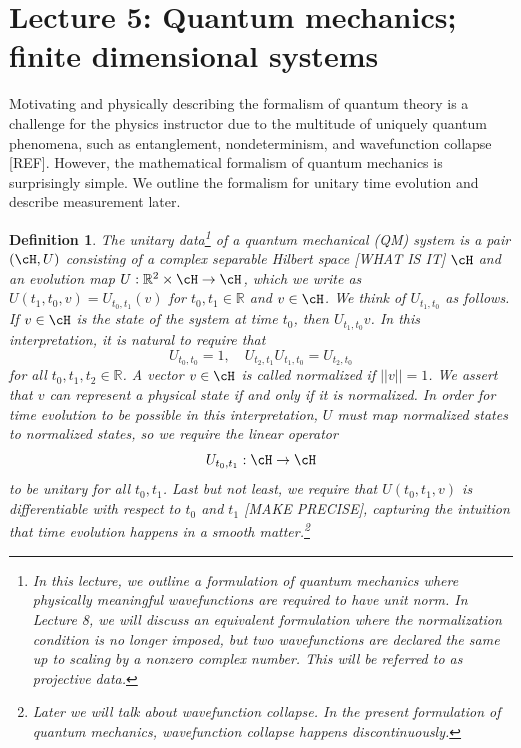 \documentclass{amsart}
\newcommand{\R}{\mathbb{R}}
\newtheorem{definition}[theorem]{Definition}
\begin{document}


\section{Lecture 5: Quantum mechanics; finite dimensional systems}
Motivating and physically describing the formalism of quantum theory is a challenge for the physics instructor due to the multitude of uniquely quantum phenomena, such as entanglement, nondeterminism, and wavefunction collapse [REF]. However, the mathematical formalism of quantum mechanics is surprisingly simple. We outline the formalism for unitary time evolution and describe measurement later.

\begin{definition}
The \emph{unitary data}\footnote{In this lecture, we outline a formulation of quantum mechanics where physically meaningful wavefunctions are required to have unit norm. In Lecture 8, we will discuss an equivalent formulation where the normalization condition is no longer imposed, but two wavefunctions are declared the same up to scaling by a nonzero complex number. This will be referred to as \emph{projective data}.} of a \emph{quantum mechanical (QM)} system is a pair $(\cH, U)$ consisting of a complex separable Hilbert space [WHAT IS IT] $\cH$ and an evolution map $U: \R^2 \times \cH \to \cH$, which we write as $U(t_1, t_0, v) = U_{t_0, t_1}(v)$ for $t_0, t_1 \in \R$ and $v \in \cH$. We think of $U_{t_1, t_0}$ as follows. If $v \in \cH$ is the state of the system at time $t_0$, then $U_{t_1, t_0} v$. In this interpretation, it is natural to require that
\begin{equation*}
    U_{t_0, t_0} = 1, \quad U_{t_2, t_1} U_{t_1, t_0} = U_{t_2, t_0}
\end{equation*}
for all $t_0, t_1, t_2 \in \R$. A vector $v \in \cH$ is called \emph{normalized} if $||v|| = 1$. We assert that $v$ can represent a physical state if and only if it is normalized. In order for time evolution to be possible in this interpretation, $U$ must map normalized states to normalized states, so we require the linear operator
\begin{equation*}
    U_{t_0, t_1}: \cH \to \cH
\end{equation*}
to be unitary for all $t_0, t_1$. Last but not least, we require that $U(t_0, t_1, v)$ is differentiable with respect to $t_0$ and $t_1$ [MAKE PRECISE], capturing the intuition that time evolution happens in a smooth matter.\footnote{Later we will talk about wavefunction collapse. In the present formulation of quantum mechanics, wavefunction collapse happens discontinuously.}
\end{definition}
\end{document}
